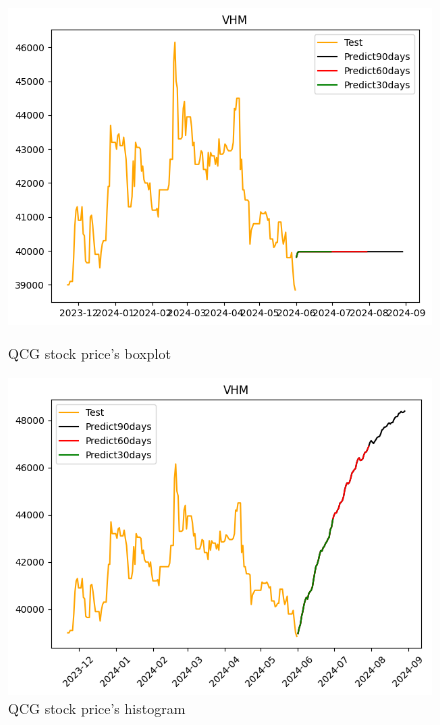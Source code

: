 \documentclass{ieeeojies}
\begin{document}
  \begin{figure}[H]
    \centering
    \begin{minipage}{0.23\textwidth}
    \centering
    \includegraphics[width=1\textwidth]{bibliography/Figure/VHMRF_9-1.png}
    \caption{QCG stock price's boxplot}
    \label{fig:1}
    \end{minipage}
    \hfill
    \begin{minipage}{0.23\textwidth}
    \centering
    \includegraphics[width=1\textwidth]{bibliography/Figure/VHMRNN_9-1.png}
    \caption{QCG stock price's histogram}
    \label{fig:2}
    \end{minipage}
  \end{figure}
  
\end{document}
